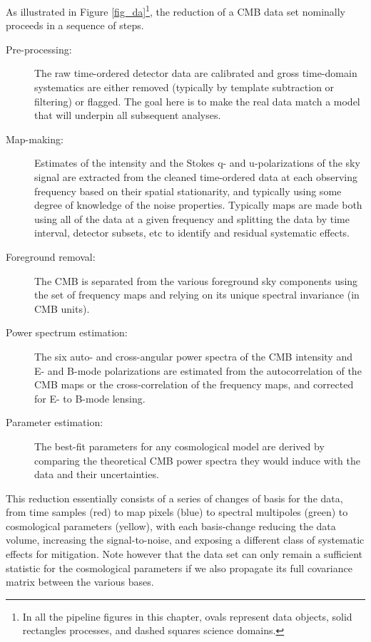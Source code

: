 As illustrated in Figure \ref{fig_da}\footnote{In all the pipeline figures in this chapter, ovals represent data objects, solid rectangles processes, and dashed squares science domains.}, the reduction of a CMB data set nominally proceeds in a sequence of steps.
\begin{description}
\item[ Pre-processing:] The raw time-ordered detector data are calibrated and gross time-domain systematics are either removed (typically by template subtraction or filtering) or flagged. The goal here is to make the real data match a model that will underpin all subsequent analyses.
\item[Map-making:] Estimates of the intensity and the Stokes q- and u-polarizations of the sky signal are extracted from the cleaned time-ordered data at each observing frequency based on their spatial stationarity, and typically using some degree of knowledge of the noise properties. Typically maps are made both using all of the data at a given frequency and splitting the data by time interval, detector subsets, etc to identify and residual systematic effects.
\item[Foreground removal:] The CMB is separated from the various foreground sky components using the set of frequency maps and relying on its unique spectral invariance (in CMB units).
\item[Power spectrum estimation:] The six auto- and cross-angular power spectra of the CMB intensity and E- and B-mode polarizations are estimated from the autocorrelation of the CMB maps or the cross-correlation of the frequency maps, and corrected for E- to B-mode lensing.
\item[Parameter estimation:] The best-fit parameters for any cosmological model are derived by comparing the theoretical CMB power spectra they would induce with the data and their uncertainties.
\end{description}

This reduction essentially consists of a series of changes of basis for the data, from time samples (red) to map pixels (blue) to spectral multipoles (green) to cosmological parameters (yellow), with each basis-change reducing the data volume, increasing the signal-to-noise, and exposing a different class of systematic effects for mitigation. Note however that the data set can only remain a sufficient statistic for the cosmological parameters if we also propagate its full covariance matrix between the various bases. 

